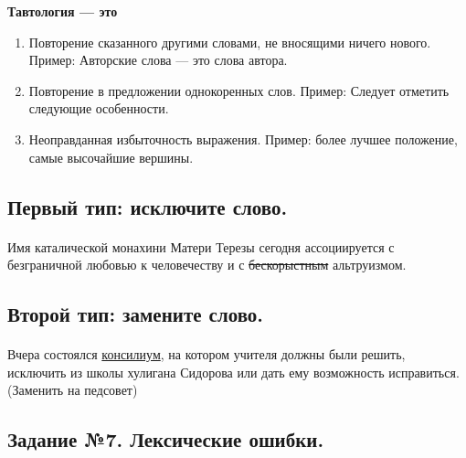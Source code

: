 \documentclass{article}
\begin{document}
\textbf{Тавтология --- это}
\begin{enumerate}
\item
Повторение сказанного другими словами, не вносящими ничего нового. Пример: Авторские слова --- это слова автора.
\item
Повторение в предложении однокоренных слов. Пример: Следует отметить следующие особенности.
\item
Неоправданная избыточность выражения. Пример: более лучшее положение, самые высочайшие вершины.
\end{enumerate}

\subsection{Первый тип: исключите слово.}
\paragraph{}
Имя каталической монахини Матери Терезы сегодня ассоциируется с безграничной любовью к человечеству и
с \sout{бескорыстным} альтруизмом.

\subsection{Второй тип: замените слово.}
\paragraph{}
Вчера состоялся \underline{консилиум}, на котором учителя должны были решить, исключить из школы
хулигана Сидорова или дать ему возможность исправиться. (Заменить на педсовет)

\newpage
\subsection{Задание №7. Лексические ошибки.}
\end{document}
